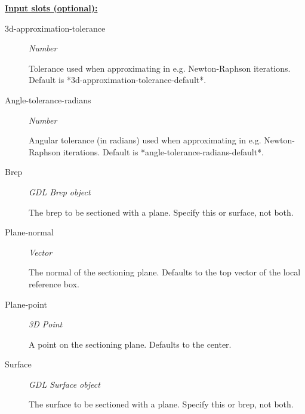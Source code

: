 \documentclass [11pt]{book}
\begin{document}
\begin{itemize}
\begin{figure}
\end{figure}





\textbf{
\underline{Input slots (optional):}}

\begin{description}

\item [3d-approximation-tolerance]
\emph{Number}

 Tolerance used when approximating in e.g. Newton-Raphson iterations.
Default is *3d-approximation-tolerance-default*.




\item [Angle-tolerance-radians]
\emph{Number}

 Angular tolerance (in radians) used when approximating in e.g. Newton-Raphson iterations.
Default is *angle-tolerance-radians-default*.




\item [Brep]
\emph{GDL Brep object}

 The brep to be sectioned with a plane. Specify this or surface, not both.




\item [Plane-normal]
\emph{Vector}

 The normal of the sectioning plane. Defaults to the top vector of the local reference box.




\item [Plane-point]
\emph{3D Point}

 A point on the sectioning plane. Defaults to the center.




\item [Surface]
\emph{GDL Surface object}

 The surface to be sectioned with a plane. Specify this or brep, not both.




\end{description}







\end{itemize}
\end{document}
